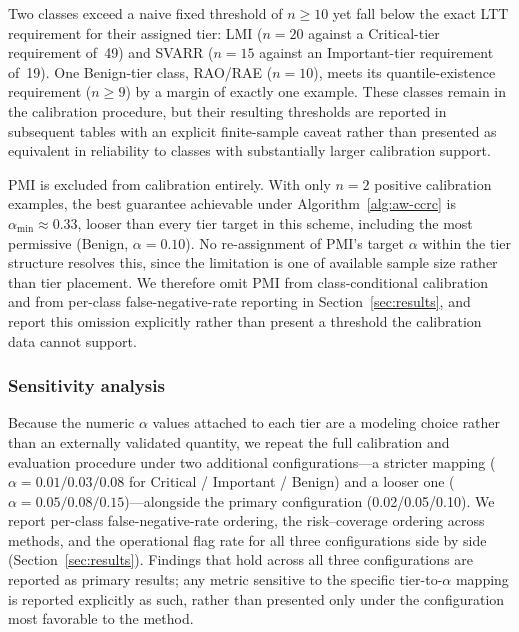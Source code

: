 Two classes exceed a naive fixed threshold of $n\ge 10$ yet fall below the exact
LTT requirement for their assigned tier: LMI ($n{=}20$ against a Critical-tier
requirement of~49) and SVARR ($n{=}15$ against an Important-tier requirement
of~19).
One Benign-tier class, RAO/RAE ($n{=}10$), meets its quantile-existence requirement
($n\ge 9$) by a margin of exactly one example.
These classes remain in the calibration procedure, but their resulting thresholds
are reported in subsequent tables with an explicit finite-sample caveat rather than
presented as equivalent in reliability to classes with substantially larger
calibration support.

PMI is excluded from calibration entirely.
With only $n{=}2$ positive calibration examples, the best guarantee achievable
under Algorithm~\ref{alg:aw-ccrc} is $\alpha_\mathrm{min}\approx 0.33$, looser
than every tier target in this scheme, including the most permissive
(Benign, $\alpha{=}0.10$).
No re-assignment of PMI's target $\alpha$ within the tier structure resolves this,
since the limitation is one of available sample size rather than tier placement.
We therefore omit PMI from class-conditional calibration and from per-class
false-negative-rate reporting in Section~\ref{sec:results}, and report this
omission explicitly rather than present a threshold the calibration data cannot
support.

\subsubsection{Sensitivity analysis}
\label{sec:sensitivity}

Because the numeric $\alpha$ values attached to each tier are a modeling choice
rather than an externally validated quantity, we repeat the full calibration and
evaluation procedure under two additional configurations---a stricter mapping
($\alpha = 0.01/0.03/0.08$ for Critical / Important / Benign) and a looser one
($\alpha = 0.05/0.08/0.15$)---alongside the primary configuration
(0.02/0.05/0.10).
We report per-class false-negative-rate ordering, the risk--coverage ordering across
methods, and the operational flag rate for all three configurations side by side
(Section~\ref{sec:results}).
Findings that hold across all three configurations are reported as primary results;
any metric sensitive to the specific tier-to-$\alpha$ mapping is reported explicitly
as such, rather than presented only under the configuration most favorable to the
method.
